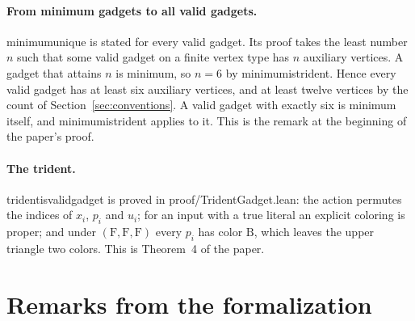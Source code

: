\documentclass[11pt,a4paper]{article}
\newcommand{\leanus}{\textunderscore\allowbreak}
\newcommand{\lean}[1]{{\ttfamily\let\_\leanus #1}}
\newcommand{\F}{\mathrm{F}}
\newcommand{\B}{\mathrm{B}}
\begin{document}
\paragraph{From minimum gadgets to all valid gadgets.}
\lean{minimum\_unique} is stated for every valid gadget. Its proof takes the
least number $n$ such that some valid gadget on a finite vertex type has $n$
auxiliary vertices. A gadget that attains $n$ is minimum, so $n=6$ by
\lean{minimum\_is\_trident}. Hence every valid gadget has at least six
auxiliary vertices, and at least twelve vertices by the count of
Section~\ref{sec:conventions}. A valid gadget with exactly six is minimum
itself, and \lean{minimum\_is\_trident} applies to it. This is the remark at
the beginning of the paper's proof.

\paragraph{The trident.} \lean{trident\_is\_valid\_gadget} is proved in
\lean{proof/TridentGadget.lean}: the action permutes the indices of $x_i$,
$p_i$ and $u_i$; for an input with a true literal an explicit coloring is
proper; and under $(\F,\F,\F)$ every $p_i$ has color $\B$, which leaves the
upper triangle two colors. This is Theorem~4 of the paper.

\section{Remarks from the formalization}\label{sec:remarks}
\end{document}
